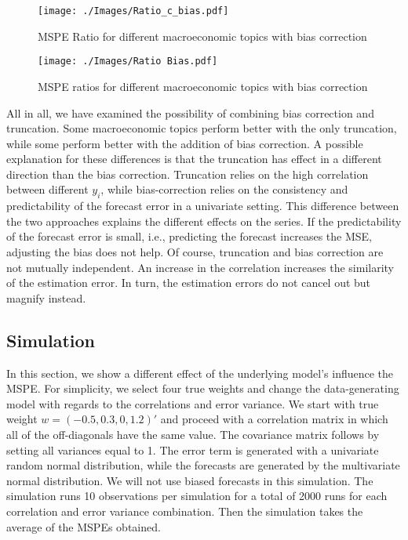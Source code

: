\documentclass[11pt]{article}
\begin{document}
	
	\begin{figure}[!h]
		\centering
		\texttt{[image: ./Images/Ratio\_c\_bias.pdf]}
		\caption{MSPE Ratio for different macroeconomic topics with bias correction}\label{fig: Ratio bias}
	\end{figure}
	
	
	\begin{figure}[!h]
		\centering
		\texttt{[image: ./Images/Ratio Bias.pdf]}
		\caption{MSPE ratios for different macroeconomic topics with bias correction}\label{fig: Ratio bias}
	\end{figure}
	
	
	All in all, we have examined the possibility of combining bias correction and truncation. Some macroeconomic topics perform better with the only truncation, while some perform better with the addition of bias correction. A possible explanation for these differences is that the truncation has effect in a different direction than the bias correction. Truncation relies on the high correlation between different $y_i$, while bias-correction relies on the consistency and predictability of the forecast error in a univariate setting. This difference between the two approaches explains the different effects on the series. If the predictability of the forecast error is small, i.e., predicting the forecast increases the MSE, adjusting the bias does not help. Of course, truncation and bias correction are not mutually independent. An increase in the correlation increases the similarity of the estimation error. In turn, the estimation errors do not cancel out but magnify instead. 
	
	
	
	\subsection{Simulation}\label{simulation}
	In this section, we show a different effect of the underlying model's influence the MSPE. For simplicity, we select four true weights and change the data-generating model with regards to the correlations and error variance. We start with true weight $w=(-0.5,0.3,0,1.2)'$ and proceed with a correlation matrix in which all of the off-diagonals have the same value. The covariance matrix follows by setting all variances equal to 1. The error term is generated with a univariate random normal distribution, while the forecasts are generated by the multivariate normal distribution. We will not use biased forecasts in this simulation. The simulation runs 10 observations per simulation for a total of 2000 runs for each correlation and error variance combination. Then the simulation takes the average of the MSPEs obtained.
	
\end{document}
